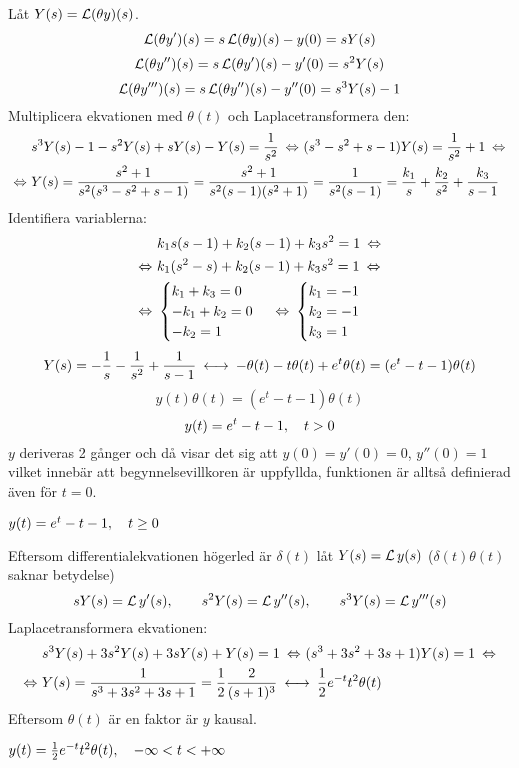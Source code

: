 \begin{task}{5.9}
	Låt $Y(s)=\operatorname{\mathcal{L}}(\theta y)(s)$.
	\[\operatorname{\mathcal{L}}(\theta y')(s)=s\operatorname{\mathcal{L}}(\theta y)(s)-y(0)=sY(s)\]
	\[\operatorname{\mathcal{L}}(\theta y'')(s)=s\operatorname{\mathcal{L}}(\theta y')(s)-y'(0)=s^2Y(s)\]
	\[\operatorname{\mathcal{L}}(\theta y''')(s)=s\operatorname{\mathcal{L}}(\theta y'')(s)-y''(0)=s^3Y(s)-1\]
	Multiplicera ekvationen med $\theta(t)$ och Laplacetransformera den:
	\begin{align*}
	&s^3Y(s)-1-s^2Y(s)+sY(s)-Y(s)=\frac{1}{s^2} \lra
	(s^3-s^2+s-1)Y(s)=\frac{1}{s^2}+1 \lra \\ \lra
	&Y(s)=\frac{s^2+1}{s^2(s^3-s^2+s-1)}=
	\frac{s^2+1}{s^2(s-1)(s^2+1)}=
	\frac{1}{s^2(s-1)}=
	\frac{k_1}{s}+\frac{k_2}{s^2}+\frac{k_3}{s-1}
	\end{align*}
	Identifiera variablerna:
	\begin{align*}
	&k_1s(s-1)+k_2(s-1)+k_3s^2=1 \lra \\ \lra
	&k_1(s^2-s)+k_2(s-1)+k_3s^2=1 \lra \\ \lra
	&\begin{cases}
	k_1+k_3=0 \\
	-k_1+k_2=0 \\
	-k_2=1
	\end{cases} \lra
	\begin{cases}
	k_1=-1 \\
	k_2=-1 \\
	k_3=1
	\end{cases}
	\end{align*}
	\begin{align*}
	Y(s)=-\frac{1}{s}-\frac{1}{s^2}+\frac{1}{s-1} \llra
	-\theta(t)-t\theta(t)+e^{t}\theta(t)=
	(e^{t}-t-1)\theta(t)
	\end{align*}
	\[y(t)\theta(t)=(e^{t}-t-1)\theta(t)\]
	\[y(t)=e^{t}-t-1, \quad t>0\]
	$y$ deriveras 2 gånger och då visar det sig att $y(0)=y'(0)=0$, $y''(0)=1$ vilket innebär att begynnelsevillkoren är uppfyllda, funktionen är alltså definierad även för $t=0$.
	
	\ans $y(t)=e^{t}-t-1, \quad t\ge0$
\end{task}

\begin{task}{5.10}
	Eftersom differentialekvationen högerled är $\delta(t)$ låt $Y(s)=\operatorname{\mathcal{L}} y(s)$ ($\delta(t)\theta(t)$ saknar betydelse)
	\[sY(s)=\operatorname{\mathcal{L}} y'(s),\qquad s^2Y(s)=\operatorname{\mathcal{L}} y''(s),\qquad s^3Y(s)=\operatorname{\mathcal{L}} y'''(s)\]
	Laplacetransformera ekvationen:
	\begin{align*}
	&s^3Y(s)+3s^2Y(s)+3sY(s)+Y(s)=1 \lra
	(s^3+3s^2+3s+1)Y(s)=1\lra \\ \lra
	&Y(s)=\frac{1}{s^3+3s^2+3s+1}=
	\frac{1}{2}\frac{2}{(s+1)^3}\llra
	\frac{1}{2}e^{-t}t^2\theta(t)
	\end{align*}
	Eftersom $\theta(t)$ är en faktor är $y$ kausal.
	
	\ans $y(t)=\frac{1}{2}e^{-t}t^2\theta(t), \quad -\infty<t<+\infty$
\end{task}

